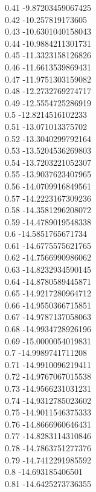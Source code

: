{0.41	-9.87203459067425\\
0.42	-10.257819173605\\
0.43	-10.6301040158043\\
0.44	-10.9884211301731\\
0.45	-11.3323158126826\\
0.46	-11.6613539869431\\
0.47	-11.9751303159082\\
0.48	-12.2732769274717\\
0.49	-12.5554725286919\\
0.5	-12.8214516102233\\
0.51	-13.071013375702\\
0.52	-13.3040299792164\\
0.53	-13.5204536269803\\
0.54	-13.7203221052307\\
0.55	-13.9037623407965\\
0.56	-14.0709916849561\\
0.57	-14.2223167309236\\
0.58	-14.3581296208072\\
0.59	-14.4789019548338\\
0.6	-14.5851765671734\\
0.61	-14.6775575621765\\
0.62	-14.7566990986062\\
0.63	-14.8232934590145\\
0.64	-14.8780589445871\\
0.65	-14.9217280964712\\
0.66	-14.9550366715851\\
0.67	-14.9787137058063\\
0.68	-14.9934728926196\\
0.69	-15.0000054019831\\
0.7	-14.9989741711208\\
0.71	-14.9910096219411\\
0.72	-14.9767067015538\\
0.73	-14.9566231031231\\
0.74	-14.9312785023602\\
0.75	-14.9011546375333\\
0.76	-14.8666960646431\\
0.77	-14.8283114310846\\
0.78	-14.7863751277376\\
0.79	-14.7412291985592\\
0.8	-14.693185406501\\
0.81	-14.6425273736355\\
}
